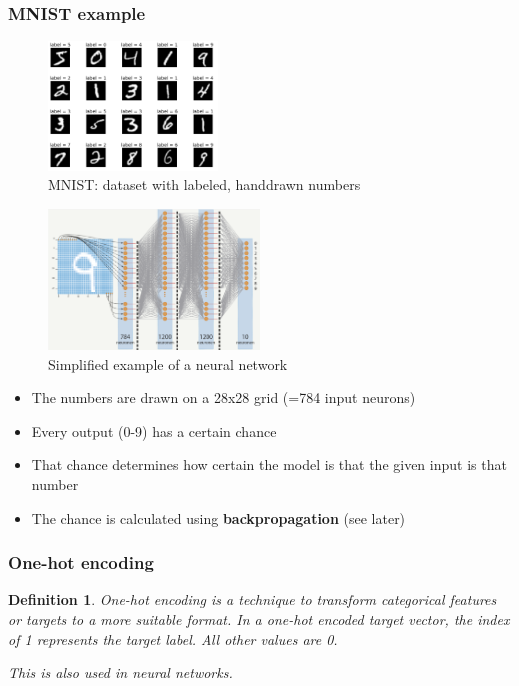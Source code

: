 \documentclass{article}
\newtheorem{theorem}{Definition}[section]
\begin{document}
\subsubsection{MNIST example}

\begin{figure}[H]
    \centering
    \includegraphics[width=0.4\textwidth]{mnist-neural.png}
    \caption{MNIST: dataset with labeled, handdrawn numbers}
\end{figure}

\begin{figure}[H]
    \centering
    \includegraphics[width=0.5\textwidth]{mnist-neural2.png}
    \caption{Simplified example of a neural network}
\end{figure}

\begin{itemize}
    \item The numbers are drawn on a 28x28 grid (=784 input neurons)
    \item Every output (0-9) has a certain chance
    \item That chance determines how certain the model is that the given input is that number
    \item The chance is calculated using \textbf{backpropagation} (see later)
\end{itemize}

\subsubsection{One-hot encoding}

\begin{theorem}
    One-hot encoding is a technique to transform categorical features or targets to a more suitable format. 
    In a one-hot encoded target vector, the index of 1 represents the target label. All other values are 0.

    This is also used in neural networks.
\end{theorem}
\end{document}
